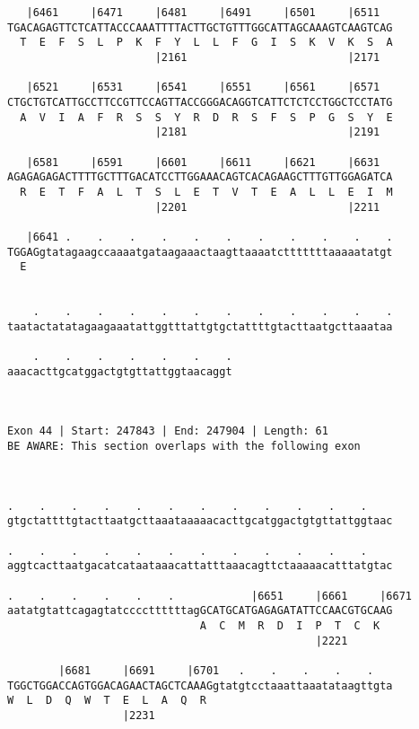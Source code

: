 \documentclass{article}
\begin{document}
\begin{Verbatim}
   |6461     |6471     |6481     |6491     |6501     |6511  
TGACAGAGTTCTCATTACCCAAATTTTACTTGCTGTTTGGCATTAGCAAAGTCAAGTCAG
  T  E  F  S  L  P  K  F  Y  L  L  F  G  I  S  K  V  K  S  A
                       |2161                         |2171  
  
   |6521     |6531     |6541     |6551     |6561     |6571  
CTGCTGTCATTGCCTTCCGTTCCAGTTACCGGGACAGGTCATTCTCTCCTGGCTCCTATG
  A  V  I  A  F  R  S  S  Y  R  D  R  S  F  S  P  G  S  Y  E
                       |2181                         |2191  
  
   |6581     |6591     |6601     |6611     |6621     |6631  
AGAGAGAGACTTTTGCTTTGACATCCTTGGAAACAGTCACAGAAGCTTTGTTGGAGATCA
  R  E  T  F  A  L  T  S  L  E  T  V  T  E  A  L  L  E  I  M
                       |2201                         |2211  
  
   |6641 .    .    .    .    .    .    .    .    .    .    .
TGGAGgtatagaagccaaaatgataagaaactaagttaaaatctttttttaaaaatatgt
  E                                                         
                                                            
  
    .    .    .    .    .    .    .    .    .    .    .    .
taatactatatagaagaaatattggtttattgtgctattttgtacttaatgcttaaataa
                                                            
    .    .    .    .    .    .    .
aaacacttgcatggactgtgttattggtaacaggt
                                   
                                   
 
Exon 44 | Start: 247843 | End: 247904 | Length: 61
BE AWARE: This section overlaps with the following exon



.    .    .    .    .    .    .    .    .    .    .    .    
gtgctattttgtacttaatgcttaaataaaaacacttgcatggactgtgttattggtaac
                                                            
.    .    .    .    .    .    .    .    .    .    .    .    
aggtcacttaatgacatcataataaacattatttaaacagttctaaaaacatttatgtac
                                                            
.    .    .    .    .    .            |6651     |6661     |6671
aatatgtattcagagtatccccttttttagGCATGCATGAGAGATATTCCAACGTGCAAG
                              A  C  M  R  D  I  P  T  C  K  
                                                |2221       
  
        |6681     |6691     |6701   .    .    .    .    .   
TGGCTGGACCAGTGGACAGAACTAGCTCAAAGgtatgtcctaaattaaatataagttgta
W  L  D  Q  W  T  E  L  A  Q  R                             
                  |2231                                     
  

\end{Verbatim}
\end{document}
